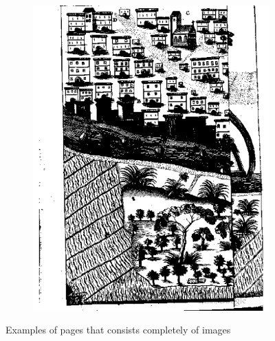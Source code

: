 \begin{figure}
\begin{subfigure}[b]{0.4\textwidth}
\includegraphics[width=\textwidth]{resources/500_0077}
    \end{subfigure}
    \caption{Examples of pages that consists completely of images}
    \label{fig:imageExamples}
\end{figure}



